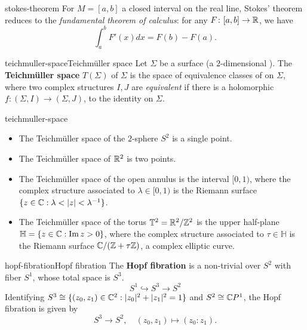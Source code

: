 \begin{example}{stokes-theorem}
    For $M = [a, b]$ a closed interval on the real line, Stokes' theorem reduces to the \textit{fundamental theorem of calculus}: for any $F \colon [a, b] \to \mathbb{R}$, we have
    \[ \int_a^b F'(x) dx = F(b) - F(a) . \]
\end{example}

\begin{topic}{teichmuller-space}{Teichmüller space}
    Let $\Sigma$ be a surface (a $2$-dimensional ). The \textbf{Teichmüller space} $T(\Sigma)$ of $\Sigma$ is the space of equivalence classes of  on $\Sigma$, where two complex structures $I, J$ are \textit{equivalent} if there is a holomorphic  $f \colon (\Sigma, I) \to (\Sigma, J)$,  to the identity on $\Sigma$.
\end{topic}

\begin{example}{teichmuller-space}
    \begin{itemize}
        \item The Teichmüller space of the $2$-sphere $S^2$ is a single point.
        \item The Teichmüller space of $\mathbb{R}^2$ is two points.
        \item The Teichmüller space of the open annulus is the interval $[0, 1)$, where the complex structure associated to $\lambda \in [0, 1)$ is the Riemann surface $\{ z \in \mathbb{C} : \lambda < |z| < \lambda^{-1} \}$.
        \item The Teichmüller space of the torus $\mathbb{T}^2 = \mathbb{R}^2/\mathbb{Z}^2$ is the upper half-plane $\mathbb{H} = \{ z \in \mathbb{C} : \operatorname{Im} z > 0 \}$, where the complex structure associated to $\tau \in \mathbb{H}$ is the Riemann surface $\mathbb{C} / (\mathbb{Z} + \tau \mathbb{Z})$, a complex elliptic curve.
    \end{itemize}
\end{example}

\begin{topic}{hopf-fibration}{Hopf fibration}
    The \textbf{Hopf fibration} is a non-trivial  over $S^2$ with fiber $S^1$, whose total space is $S^3$.
    \[ S^1 \hookrightarrow S^3 \to S^2 \]
    Identifying $S^3 \cong \{ (z_0, z_1) \in \mathbb{C}^2 : |z_0|^2 + |z_1|^2 = 1 \}$ and $S^2 \cong \mathbb{C} P^1$, the Hopf fibration is given by
    \[ S^3 \to S^2, \quad (z_0, z_1) \mapsto (z_0 : z_1) . \]
\end{topic}

